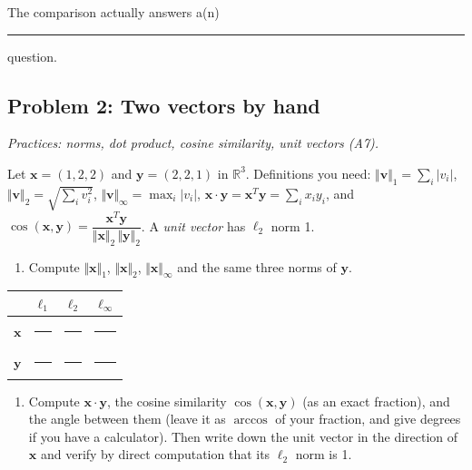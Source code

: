 \documentclass[
  11pt,
]{article}
\newcounter{none} %
\providecommand{\tightlist}{%
  \setlength{\itemsep}{0pt}\setlength{\parskip}{0pt}}
\newcommand{\answerspace}[1]{\par\vspace*{#1}}  %
\newcommand{\blank}[1][1.2in]{\rule{#1}{0.4pt}}
\newcommand{\answerpage}{\clearpage}
\begin{document}
The comparison actually answers a(n) \blank[1.6in] question.

\answerspace{1.6in}

\answerpage

\subsection{Problem 2: Two vectors by
hand}\label{problem-2-two-vectors-by-hand}

\emph{Practices: norms, dot product, cosine similarity, unit vectors
(A7).}

Let \(\mathbf{x} = (1, 2, 2)\) and \(\mathbf{y} = (2, 2, 1)\) in
\(\mathbb{R}^3\). Definitions you need:
\(\Vert\mathbf{v}\Vert_1 = \sum_i |v_i|\),
\(\Vert\mathbf{v}\Vert_2 = \sqrt{\sum_i v_i^2}\),
\(\Vert\mathbf{v}\Vert_\infty = \max_i |v_i|\),
\(\mathbf{x}\cdot\mathbf{y} = \mathbf{x}^T\mathbf{y} = \sum_i x_i y_i\),
and
\(\cos(\mathbf{x},\mathbf{y}) = \dfrac{\mathbf{x}^T\mathbf{y}}{\Vert\mathbf{x}\Vert_2\,\Vert\mathbf{y}\Vert_2}\).
A \emph{unit vector} has \(\ell_2\) norm 1.

\begin{enumerate}
\def\labelenumi{(\alph{enumi})}
\tightlist
\item
  Compute \(\Vert\mathbf{x}\Vert_1\), \(\Vert\mathbf{x}\Vert_2\),
  \(\Vert\mathbf{x}\Vert_\infty\) and the same three norms of
  \(\mathbf{y}\).
\end{enumerate}

{\def\LTcaptype{none} %
\begin{longtable}[]{@{}cccc@{}}
\toprule\noalign{}
& \(\ell_1\) & \(\ell_2\) & \(\ell_\infty\) \\
\midrule\noalign{}
\endhead
\bottomrule\noalign{}
\endlastfoot
\(\mathbf{x}\) & \blank[0.8in] & \blank[0.8in] & \blank[0.8in] \\
\(\mathbf{y}\) & \blank[0.8in] & \blank[0.8in] & \blank[0.8in] \\
\end{longtable}
}

\answerspace{1.4in}

\begin{enumerate}
\def\labelenumi{(\alph{enumi})}
\setcounter{enumi}{1}
\tightlist
\item
  Compute \(\mathbf{x}\cdot\mathbf{y}\), the cosine similarity
  \(\cos(\mathbf{x},\mathbf{y})\) (as an exact fraction), and the angle
  between them (leave it as \(\arccos\) of your fraction, and give
  degrees if you have a calculator). Then write down the unit vector in
  the direction of \(\mathbf{x}\) and verify by direct computation that
  its \(\ell_2\) norm is 1.
\end{enumerate}
\end{document}
